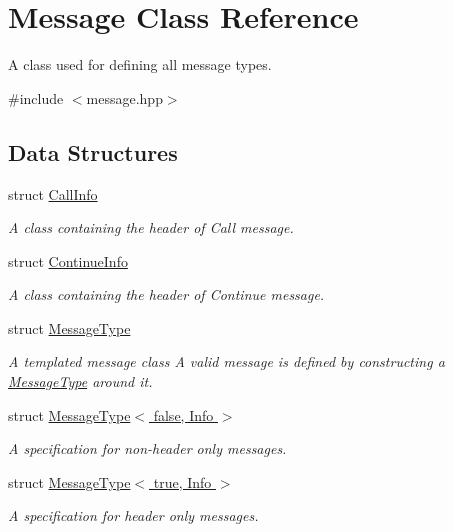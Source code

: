 \hypertarget{class_message}{}\section{Message Class Reference}
\label{class_message}


A class used for defining all message types.  




{\ttfamily \#include $<$message.\+hpp$>$}

\subsection*{Data Structures}
\begin{DoxyCompactItemize}
\item 
struct \hyperlink{struct_message_1_1_call_info}{Call\+Info}
\begin{DoxyCompactList}\small\item\em A class containing the header of Call message. \end{DoxyCompactList}\item 
struct \hyperlink{struct_message_1_1_continue_info}{Continue\+Info}
\begin{DoxyCompactList}\small\item\em A class containing the header of Continue message. \end{DoxyCompactList}\item 
struct \hyperlink{struct_message_1_1_message_type}{Message\+Type}
\begin{DoxyCompactList}\small\item\em A templated message class A valid message is defined by constructing a \hyperlink{struct_message_1_1_message_type}{Message\+Type} around it. \end{DoxyCompactList}\item 
struct \hyperlink{struct_message_1_1_message_type_3_01false_00_01_info_01_4}{Message\+Type$<$ false, Info $>$}
\begin{DoxyCompactList}\small\item\em A specification for non-\/header only messages. \end{DoxyCompactList}\item 
struct \hyperlink{struct_message_1_1_message_type_3_01true_00_01_info_01_4}{Message\+Type$<$ true, Info $>$}
\begin{DoxyCompactList}\small\item\em A specification for header only messages. \end{DoxyCompactList}\item 

\end{DoxyCompactItemize}
